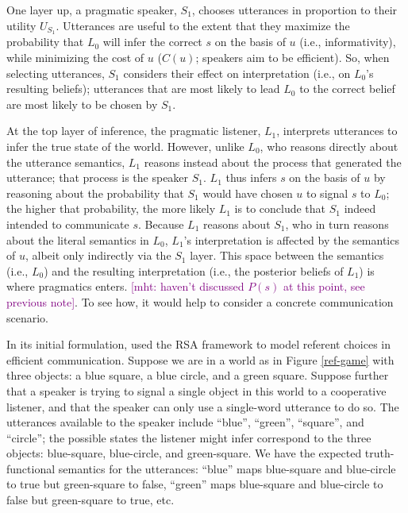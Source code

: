 \documentclass{sp}
\newcommand{\mht}[1]{\textcolor{purple}{[mht: #1]}}
\begin{document}
One layer up, a pragmatic speaker, $S_1$, chooses utterances in proportion to their utility $U_{S_{1}}$. Utterances are useful to the extent that they maximize the probability that $L_0$ will infer the correct $s$ on the basis of $u$ (i.e., informativity), while minimizing the cost of $u$ ($C(u)$; speakers aim to be efficient). So, when selecting utterances, $S_1$ considers their effect on interpretation (i.e., on $L_0$'s resulting beliefs); utterances that are most likely to lead $L_0$ to the correct belief are most likely to be chosen by $S_1$.

At the top layer of inference, the pragmatic listener, $L_1$, interprets utterances to infer the true state of the world. However, unlike $L_0$, who reasons directly about the utterance semantics, $L_1$ reasons instead about the process that generated the utterance; that process is the speaker $S_1$. $L_1$ thus infers $s$ on the basis of $u$ by reasoning about the probability that $S_1$ would have chosen $u$ to signal $s$ to $L_0$; the higher that probability, the more likely $L_1$ is to conclude that $S_1$ indeed intended to communicate $s$. Because $L_1$ reasons about $S_1$, who in turn reasons about the literal semantics in $L_0$, $L_1$'s interpretation is affected by the semantics of $u$, albeit only indirectly via the $S_1$ layer. This space between the semantics (i.e., $L_0$) and the resulting interpretation (i.e., the posterior beliefs of $L_1$) is where pragmatics enters. \mht{haven't discussed $P(s)$ at this point, see previous note}. To see how, it would help to consider a concrete communication scenario.

In its initial formulation, \cite{frankgoodman2012} used the RSA framework to model referent choices in efficient communication. Suppose we are in a world as in Figure \ref{ref-game} with three objects: a blue square, a blue circle, and a green square. Suppose further that a speaker is trying to signal a single object in this world to a cooperative listener, and that the speaker can only use a single-word utterance to do so. The utterances available to the speaker include ``blue'', ``green'', ``square'', and ``circle''; the possible states the listener might infer correspond to the three objects: blue-square, blue-circle, and green-square. We have the expected truth-functional semantics for the utterances: ``blue'' maps blue-square and blue-circle to true but green-square to false, ``green'' maps blue-square and blue-circle to false but green-square to true, etc.
\end{document}
